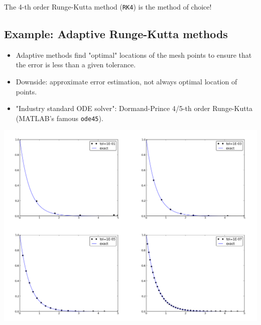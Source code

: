 \documentclass[%
oneside,                 %
final,                   %
10pt]{article}
\begin{document}
The 4-th order Runge-Kutta method (\texttt{RK4}) is the method of choice!


\subsection*{Example: Adaptive Runge-Kutta methods}

\begin{itemize}
 \item Adaptive methods find "optimal" locations of the mesh points
   to ensure that the error is less than a given tolerance.

 \item Downside: approximate error estimation, not always optimal
   location of points.

 \item "Industry standard ODE solver": Dormand-Prince 4/5-th order
   Runge-Kutta (MATLAB's famous \texttt{ode45}).
\end{itemize}

\noindent
\centerline{\includegraphics[width=0.9\linewidth]{fig-genz/decay_DormandPrince_adaptivity.png}}




\cleardoublepage{}  %
\printindex
\end{document}
